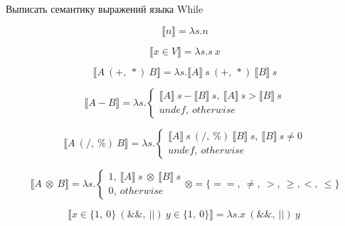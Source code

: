 \begin{problem}
  Выписать семантику выражений языка While
  
  \begin{equation}
    \llbracket n \rrbracket  = \lambda s.n
  \end{equation}

  \begin{equation}
      \llbracket x \in V  \rrbracket = \lambda s.s \ x
  \end{equation}
  
  \begin{equation}
      \llbracket A \ (+,\ *) \ B \rrbracket = 
        \lambda s. \llbracket A \rrbracket \ s \ (+,\ *) \ \llbracket B \rrbracket \ s
  \end{equation}

  \begin{equation}
    \llbracket A - B \rrbracket = \lambda s.
    \begin{cases}
      \llbracket A \rrbracket \ s - \llbracket B \rrbracket \ s, \ \llbracket A \rrbracket \ s > \llbracket B \rrbracket \ s \\
      undef,\ otherwise
    \end{cases}
  \end{equation}

  \begin{equation}
    \llbracket A \ (/,\ \%) \ B \rrbracket = \lambda s.
    \begin{cases}
      \llbracket A \rrbracket \ s \ (/,\ \%) \ \llbracket B \rrbracket \ s, \ \llbracket B \rrbracket \ s \ne 0 \\
      undef,\ otherwise
    \end{cases}
  \end{equation}

  \begin{equation}
    \llbracket A \ \otimes \ B \rrbracket = \lambda s.
    \begin{cases}
      1, \ \llbracket A \rrbracket \ s \ \otimes \  \llbracket B \rrbracket \ s \\
      0,\ otherwise
    \end{cases}
    \otimes = \{ ==,\ \ne,\ >,\ \geq, <,\ \leq \} 
  \end{equation}

  \begin{equation}
    \llbracket x \in \{1,\ 0 \} \ (\&\&,\ ||) \ y \in \{1,\ 0 \} \rrbracket = \lambda s.
      x \ (\&\&,\ ||) \ y \
  \end{equation}

\end{problem}

